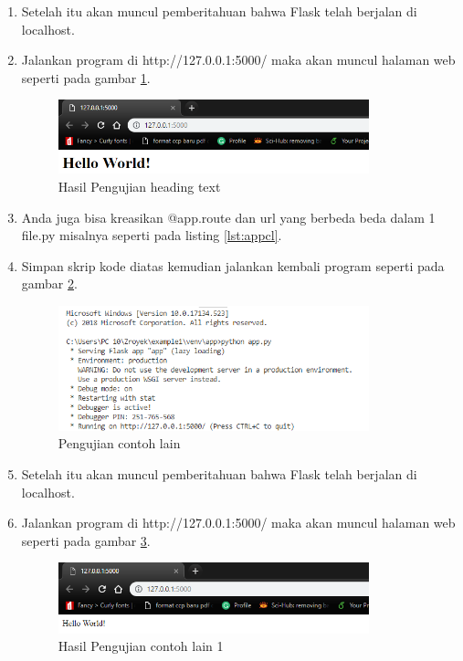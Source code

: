\begin{enumerate}
\item Setelah itu akan muncul pemberitahuan bahwa Flask telah berjalan di localhost.
\item Jalankan program di http://127.0.0.1:5000/  maka akan muncul halaman web seperti pada gambar \ref{fig:hujiht}.
\begin{figure}[!htbp]
	\centerline{\includegraphics[width=0.85\textwidth]{figures/9/hujiht.PNG}}
	\caption{Hasil Pengujian heading text}
	\label{fig:hujiht}
\end{figure}

\item Anda juga bisa kreasikan @app.route dan url yang berbeda beda dalam 1 file.py misalnya seperti pada listing \ref{lst:appcl}.


\item Simpan skrip kode diatas kemudian jalankan kembali program seperti pada gambar \ref{fig:ujicl}.
\begin{figure}[!htbp]
	\centerline{\includegraphics[width=0.85\textwidth]{figures/9/ujicl.PNG}}
	\caption{Pengujian contoh lain}
	\label{fig:ujicl}
\end{figure}

\item Setelah itu akan muncul pemberitahuan bahwa Flask telah berjalan di localhost.
\item Jalankan program di http://127.0.0.1:5000/ maka akan muncul halaman web seperti pada gambar \ref{fig:hujicl1}.
\begin{figure}[!htbp]
	\centerline{\includegraphics[width=0.85\textwidth]{figures/9/hujicl1.PNG}}
	\caption{Hasil Pengujian contoh lain 1}
	\label{fig:hujicl1}
\end{figure}


\end{enumerate}

